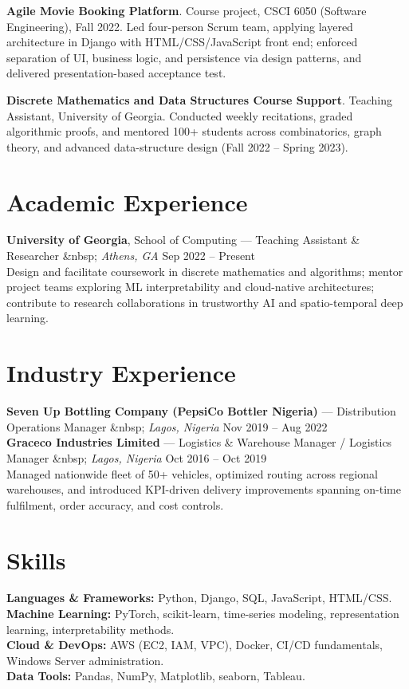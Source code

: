 \documentclass[11pt]{article}
\begin{document}
\textbf{Agile Movie Booking Platform}. Course project, CSCI 6050 (Software Engineering), Fall 2022. Led four-person Scrum team, applying layered architecture in Django with HTML/CSS/JavaScript front end; enforced separation of UI, business logic, and persistence via design patterns, and delivered presentation-based acceptance test.

\textbf{Discrete Mathematics and Data Structures Course Support}. Teaching Assistant, University of Georgia. Conducted weekly recitations, graded algorithmic proofs, and mentored 100+ students across combinatorics, graph theory, and advanced data-structure design (Fall 2022 -- Spring 2023).

\section*{Academic Experience}
\textbf{University of Georgia}, School of Computing --- Teaching Assistant & Researcher &nbsp; \emph{Athens, GA} \hfill Sep 2022 -- Present\\
Design and facilitate coursework in discrete mathematics and algorithms; mentor project teams exploring ML interpretability and cloud-native architectures; contribute to research collaborations in trustworthy AI and spatio-temporal deep learning.

\section*{Industry Experience}
\textbf{Seven Up Bottling Company (PepsiCo Bottler Nigeria)} --- Distribution Operations Manager &nbsp; \emph{Lagos, Nigeria} \hfill Nov 2019 -- Aug 2022\\

\textbf{Graceco Industries Limited} --- Logistics \& Warehouse Manager / Logistics Manager &nbsp; \emph{Lagos, Nigeria} \hfill Oct 2016 -- Oct 2019\\
Managed nationwide fleet of 50+ vehicles, optimized routing across regional warehouses, and introduced KPI-driven delivery improvements spanning on-time fulfilment, order accuracy, and cost controls.

\section*{Skills}
\textbf{Languages \& Frameworks:} Python, Django, SQL, JavaScript, HTML/CSS.\\
\textbf{Machine Learning:} PyTorch, scikit-learn, time-series modeling, representation learning, interpretability methods.\\
\textbf{Cloud \& DevOps:} AWS (EC2, IAM, VPC), Docker, CI/CD fundamentals, Windows Server administration.\\
\textbf{Data Tools:} Pandas, NumPy, Matplotlib, seaborn, Tableau.
\end{document}
